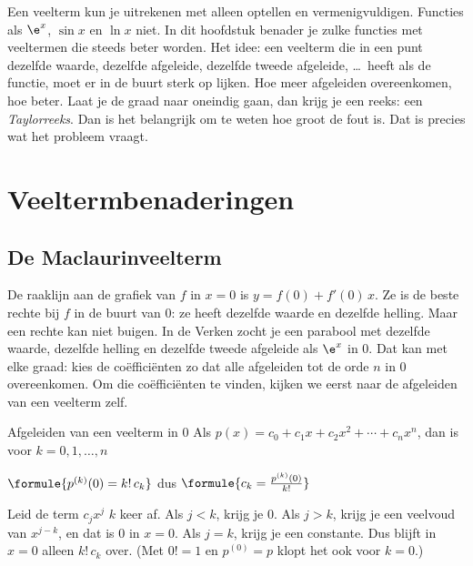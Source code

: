 Een veelterm kun je uitrekenen met alleen optellen en vermenigvuldigen. Functies als $\e^x$, $\sin x$ en $\ln x$ niet. In dit hoofdstuk benader je zulke functies met veeltermen die steeds beter worden. Het idee: een veelterm die in een punt dezelfde waarde, dezelfde afgeleide, dezelfde tweede afgeleide, \ldots\ heeft als de functie, moet er in de buurt sterk op lijken. Hoe meer afgeleiden overeenkomen, hoe beter. Laat je de graad naar oneindig gaan, dan krijg je een reeks: een \textit{Taylorreeks}. Dan is het belangrijk om te weten hoe groot de fout is. Dat is precies wat het probleem vraagt.

\begin{oefeningen}[Start]

\end{oefeningen}


\section{Veeltermbenaderingen}

\subsection{De Maclaurinveelterm}

De raaklijn aan de grafiek van $f$ in $x = 0$ is $y = f(0) + f'(0)\,x$. Ze is de beste rechte bij $f$ in de buurt van 0: ze heeft dezelfde waarde en dezelfde helling. Maar een rechte kan niet buigen. In de Verken zocht je een parabool met dezelfde waarde, dezelfde helling en dezelfde tweede afgeleide als $\e^x$ in 0. Dat kan met elke graad: kies de coëfficiënten zo dat alle afgeleiden tot de orde $n$ in 0 overeenkomen. Om die coëfficiënten te vinden, kijken we eerst naar de afgeleiden van een veelterm zelf.

\begin{theorie}
\begin{stelling}{Afgeleiden van een veelterm in 0}
Als $p(x) = c_0 + c_1 x + c_2 x^2 + \cdots + c_n x^n$, dan is voor $k = 0, 1, \ldots, n$

\vspace{1mm}
\qquad $\formule{p^{(k)}(0) = k!\, c_k}$ \qquad dus \qquad $\formule{c_k = \frac{p^{(k)}(0)}{k!}}$
\end{stelling}

\begin{bewijs}
Leid de term $c_j x^j$ $k$ keer af. Als $j < k$, krijg je 0. Als $j > k$, krijg je een veelvoud van $x^{j-k}$, en dat is 0 in $x = 0$. Als $j = k$, krijg je
een constante. Dus blijft in $x = 0$ alleen $k!\,c_k$ over. (Met $0! = 1$ en $p^{(0)} = p$ klopt het ook voor $k = 0$.)
\end{bewijs}
\end{theorie}

